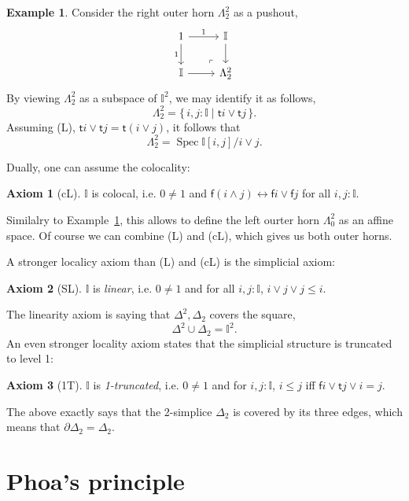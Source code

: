 \documentclass[12pt]{amsart}
\theoremstyle{definition}
\newtheorem{example}[theorem]{Example}
\newtheorem*{axiom}{Axiom}
\newcommand{\mbb}[1]{\mathbb{#1}}
\newcommand{\I}{\mbb I}
\newcommand{\ms}[1]{\mathsf{#1}}
\newcommand{\scomp}[2]{\{\,#1\mid#2\,\}}
\newcommand{\eq}{\leftrightarrow}
\newcommand{\spec}{\operatorname{Spec}}
\begin{document}
\begin{example}\label{exm:hornaffine}
  Consider the right outer horn $\Lambda^2_2$ as a pushout,
  \[
    \begin{tikzcd}
      1 \ar[d, "1"'] \ar[r, "1"] & \I \ar[d] \\
      \I \ar[r] & \Lambda^2_2
      \arrow["\lrcorner"{anchor=center, pos=0.125, rotate=180}, draw=none, from=2-2, to=1-1]
    \end{tikzcd}
  \]
  By viewing $\Lambda^2_2$ as a subspace of $\I^2$, we may identify it as follows,
  \[ \Lambda^2_2 = \scomp{i,j : \I}{\ms ti \vee \ms tj}. \]
  Assuming (L), $\ms ti \vee \ms tj = \ms t(i\vee j)$, it follows that 
  \[ \Lambda^2_2 = \spec \I[i,j]/i \vee j. \]
\end{example}

Dually, one can assume the colocality:

\begin{axiom}[cL]
  $\I$ is colocal, i.e. $0 \neq 1$ and $\ms f(i \wedge j) \eq \ms fi \vee \ms fj$ for all $i,j : \I$.
\end{axiom}

Similalry to Example~\ref{exm:hornaffine}, this allows to define the left ourter horn $\Lambda^2_0$ as an affine space. Of course we can combine (L) and (cL), which gives us both outer horns.

A stronger localicy axiom than (L) and (cL) is the simplicial axiom:

\begin{axiom}[SL]
  $\I$ is \emph{linear}, i.e. $0 \neq 1$ and for all $i,j : \I$, $i \vee j \vee j \le i$.
\end{axiom}

The linearity axiom is saying that $\Delta^2,\Delta_2$ covers the square,
\[ \Delta^2 \cup \Delta_2 = \I^2. \]
An even stronger locality axiom states that the simplicial structure is truncated to level 1:

\begin{axiom}[1T]
  $\I$ is \emph{1-truncated}, i.e. $0 \neq 1$ and for $i,j : \I$, $i \le j$ iff $\ms fi \vee \ms tj \vee i = j$.
\end{axiom}

The above exactly says that the 2-simplice $\Delta_2$ is covered by its three edges, which means that $\partial\Delta_2 = \Delta_2$.

\section{Phoa's principle}\label{sec:intposet}
\end{document}
